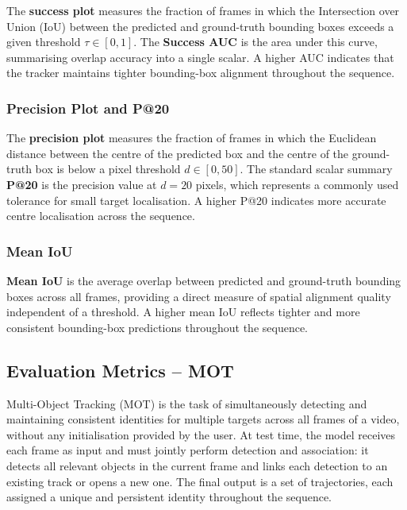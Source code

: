 \documentclass[11pt]{article}
\begin{document}
The \textbf{success plot} measures the fraction of frames in which the Intersection over Union (IoU) between the predicted and ground-truth bounding boxes exceeds a given threshold $\tau \in [0, 1]$. The \textbf{Success AUC} is the area under this curve, summarising overlap accuracy into a single scalar. A higher AUC indicates that the tracker maintains tighter bounding-box alignment throughout the sequence.

\subsubsection*{Precision Plot and P@20}

The \textbf{precision plot} measures the fraction of frames in which the Euclidean distance between the centre of the predicted box and the centre of the ground-truth box is below a pixel threshold $d \in [0, 50]$. The standard scalar summary \textbf{P@20} is the precision value at $d = 20$ pixels, which represents a commonly used tolerance for small target localisation. A higher P@20 indicates more accurate centre localisation across the sequence.

\subsubsection*{Mean IoU}

\textbf{Mean IoU} is the average overlap between predicted and ground-truth bounding boxes across all frames, providing a direct measure of spatial alignment quality independent of a threshold. A higher mean IoU reflects tighter and more consistent bounding-box predictions throughout the sequence.

\hypertarget{Evaluation Metrics - MOT}{%
\subsection{Evaluation Metrics -- MOT}\label{Evaluation Metrics - MOT}}

Multi-Object Tracking (MOT) is the task of simultaneously detecting and maintaining consistent identities for multiple targets across all frames of a video, without any initialisation provided by the user. At test time, the model receives each frame as input and must jointly perform detection and association: it detects all relevant objects in the current frame and links each detection to an existing track or opens a new one. The final output is a set of trajectories, each assigned a unique and persistent identity throughout the sequence.
\end{document}

